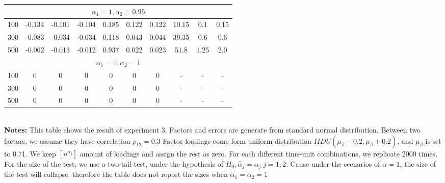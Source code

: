 \begin{table}[]
\begin{tabular}{lccccccccc}
		\multicolumn{10}{c}{$\alpha_1 = 1, \alpha_2 = 0.95$}                                                                                                                          \\ \hline
		\multicolumn{1}{l|}{100}                & -0.134 & -0.101 & \multicolumn{1}{c|}{-0.104} & 0.185 & 0.122 & \multicolumn{1}{c|}{0.122} & 10.15        & 0.1        & 0.15       \\
		\multicolumn{1}{l|}{300}                & -0.083 & -0.034 & \multicolumn{1}{c|}{-0.034} & 0.118 & 0.043 & \multicolumn{1}{c|}{0.044} & 39.35        & 0.6        & 0.6        \\
		\multicolumn{1}{l|}{500}                & -0.062 & -0.013 & \multicolumn{1}{c|}{-0.012} & 0.937 & 0.022 & \multicolumn{1}{c|}{0.023} & 51.8         & 1.25       & 2.0        \\ \hline
		\multicolumn{10}{c}{$\alpha_1=1, \alpha_2 = 1$}                                                                                                                               \\ \hline
		\multicolumn{1}{l|}{100}                & 0      & 0      & \multicolumn{1}{c|}{0}      & 0     & 0     & \multicolumn{1}{c|}{0}     & -            & -          & -          \\
		\multicolumn{1}{l|}{300}                & 0      & 0      & \multicolumn{1}{c|}{0}      & 0     & 0     & \multicolumn{1}{c|}{0}     & -            & -          & -          \\
		\multicolumn{1}{l|}{500}                & 0      & 0      & \multicolumn{1}{c|}{0}      & 0     & 0     & \multicolumn{1}{c|}{0}     & -            & -          & -          \\ \hline\hline
	\end{tabular}
\bigskip \\
{\bf Notes:}
This table shows the result of  experiment 3.
Factors and errors are generate from standard normal distribution.
Between two factors, we assume they have correlation $\rho_{12} = 0.3$
Factor loadings come form uniform distribution $IIDU(\mu_{\beta} - 0.2, \mu_{\beta}+0.2)$, and $\mu_{\beta}$ is set to 0.71.
We keep  $[n^{\alpha_{j}}]$ amount of loadings and assign the rest as zero.
For each different time-unit combinations, we replicate 2000 times.
For the size of the test, we use a two-tail test, under the hypothesis of $H_0, \hat{\alpha}_j = \alpha_j\; j=1,2$.
Cause under the scenarios of $\alpha = 1$, the size of the test will collapse, therefore the table does not report the sizes when $\alpha_1 = \alpha_2 = 1$
\end{table}


